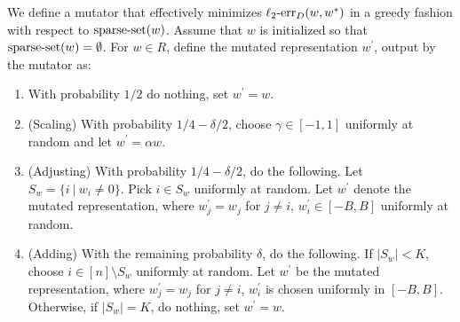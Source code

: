 We define a mutator that effectively minimizes $\mathrm{\ell_2\mbox{-}err}_D(w, w^*)$ in a greedy
fashion with respect to $\mathrm{sparse\mbox{-}set}(w)$.
Assume that $w$ is initialized so that $\mathrm{sparse\mbox{-}set}(w) = \emptyset$.
For $w \in R$, define the mutated representation $w^\prime$, output by the mutator as:
\begin{enumerate}
\item With probability $1/2$ do nothing, set $w^\prime = w$.
\item (Scaling) With probability $1/4 - \delta/2$, choose $\gamma \in [-1, 1]$ uniformly at random and
let $w^\prime = \alpha w$. 
\item (Adjusting) With probability $1/4 - \delta/2$, do the following. Let $S_w = \{ i~|~ w_i \neq 0
\}$. Pick $i \in S_w$ uniformly at random. Let $w^\prime$ denote the
mutated representation, where $w^\prime_j = w_j$ for $j \neq i$, $w^\prime_i \in
[-B, B]$ uniformly at random. 
\item (Adding) With the remaining probability $\delta$, do the following.
If $|S_w| < K$, choose $i \in [n] \setminus S_w$ uniformly at random. Let
$w^\prime$ be the mutated representation, where $w_j^\prime = w_j$ for $j \neq
i$, $w^\prime_i$ is chosen uniformly in $[-B, B]$. 
Otherwise, if $|S_w| = K$, do nothing, set $w^\prime = w$.
\end{enumerate}
